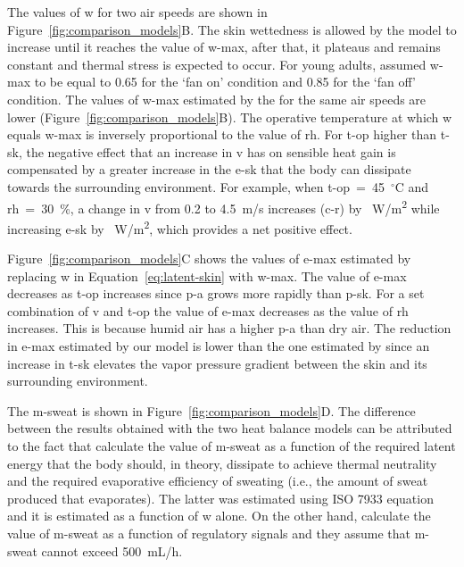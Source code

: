 The values of \ac{w} for two air speeds are shown in Figure~\ref{fig:comparison_models}B\@.
The skin wettedness is allowed by the model to increase until it reaches the value of \ac{w-max}, after that, it plateaus and remains constant and thermal stress is expected to occur.
For young adults,  assumed \ac{w-max} to be equal to 0.65 for the `fan on' condition and 0.85 for the `fan off' condition.
The values of \ac{w-max} estimated by the  for the same air speeds are lower (Figure~\ref{fig:comparison_models}B).
The operative temperature at which \ac{w} equals \ac{w-max} is inversely proportional to the value of \ac{rh}.
For \ac{t-op} higher than \ac{t-sk}, the negative effect that an increase in \ac{v} has on sensible heat gain is compensated by a greater increase in the \acf{e-sk} that the body can dissipate towards the surrounding environment.
For example, when \ac{t-op}~=~45~$^{\circ}$C and \ac{rh}~=~30~\%, a change in \ac{v} from 0.2 to 4.5~m/s increases (\acs{c-r}) by ~W/m\textsuperscript{2} while increasing \ac{e-sk} by ~W/m\textsuperscript{2}, which provides a net positive effect.

Figure~\ref{fig:comparison_models}C shows the values of \ac{e-max} estimated by replacing \ac{w} in Equation~\ref{eq:latent-skin} with \ac{w-max}.
The value of \ac{e-max} decreases as \ac{t-op} increases since \ac{p-a} grows more rapidly than \ac{p-sk}.
For a set combination of \ac{v} and \ac{t-op} the value of \ac{e-max} decreases as the value of \ac{rh} increases.
This is because humid air has a higher \ac{p-a} than dry air.
The reduction in \ac{e-max} estimated by our model is lower than the one estimated by  since an increase in \ac{t-sk} elevates the vapor pressure gradient between the skin and its surrounding environment.

The \acf{m-sweat} is shown in Figure~\ref{fig:comparison_models}D\@.
The difference between the results obtained with the two heat balance models can be attributed to the fact that \citeauthor{Jay2015} calculate the value of \ac{m-sweat} as a function of the required latent energy that the body should, in theory, dissipate to achieve thermal neutrality and the required evaporative efficiency of sweating (i.e., the amount of sweat produced that evaporates).
The latter was estimated using ISO 7933 equation and it is estimated as a function of \ac{w} alone.
On the other hand, \citeauthor{GaggeSET} calculate the value of \ac{m-sweat} as a function of regulatory signals and they assume that \ac{m-sweat} cannot exceed 500~mL/h.

